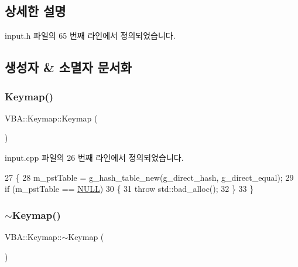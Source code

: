 \subsection{상세한 설명}


input.\+h 파일의 65 번째 라인에서 정의되었습니다.



\subsection{생성자 \& 소멸자 문서화}
\mbox{\label{class_v_b_a_1_1_keymap_a4bfe26cd2bbd32743c62fb73892e256c}} 
\subsubsection{\texorpdfstring{Keymap()}{Keymap()}}
{\footnotesize\ttfamily V\+B\+A\+::\+Keymap\+::\+Keymap (\begin{DoxyParamCaption}{ }\end{DoxyParamCaption})}



input.\+cpp 파일의 26 번째 라인에서 정의되었습니다.


\begin{DoxyCode}
27 \{
28   m\_pstTable = g\_hash\_table\_new(g\_direct\_hash, g\_direct\_equal);
29   \textcolor{keywordflow}{if} (m\_pstTable == \mbox{\hyperlink{getopt1_8c_a070d2ce7b6bb7e5c05602aa8c308d0c4}{NULL}})
30   \{
31     \textcolor{keywordflow}{throw} std::bad\_alloc();
32   \}
33 \}
\end{DoxyCode}
\mbox{\label{class_v_b_a_1_1_keymap_affd3b003c7a026ce1ceea6581d042d1d}} 
\subsubsection{\texorpdfstring{$\sim$\+Keymap()}{~Keymap()}}
{\footnotesize\ttfamily V\+B\+A\+::\+Keymap\+::$\sim$\+Keymap (\begin{DoxyParamCaption}{ }\end{DoxyParamCaption})}




